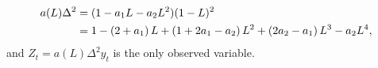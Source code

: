 \documentclass[a4paper,12pt]{article}
\begin{document}
\begin{align}
a(L)\Delta ^{2}& =(1-a_{1}L-a_{2}L^{2})(1-L)^{2}  \notag \\
& =1-\left( 2+a_{1}\right) L+\left( 1+2a_{1}-a_{2}\right) L^{2}+\left(
2a_{2}-a_{1}\right) L^{3}-a_{2}L^{4},  \label{expaL}
\end{align}%
and $Z_{t}=a(L)\Delta ^{2}y_{t}$ is the only observed variable.
\end{document}
